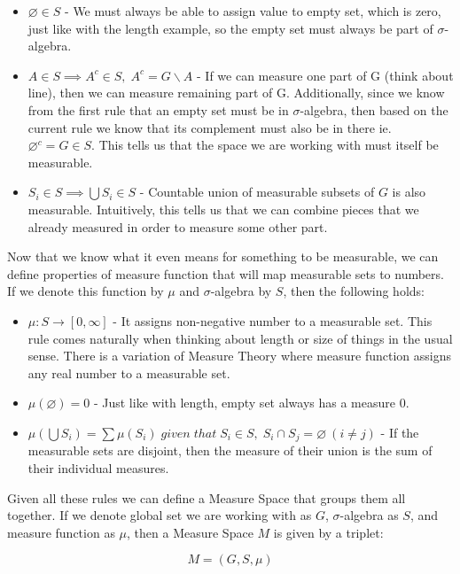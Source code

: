 \documentclass{article}
\begin{document}
\begin{itemize}
    \item $\varnothing \in S$ - We must always be able to assign value to empty set, which is zero, just like with the length example, so the empty set must always be part of $\sigma$-algebra.
    \item $A \in S \implies A^c \in S,\;A^c = G \backslash A$ - If we can measure one part of G (think about line), then we can measure remaining part of G. Additionally, since we know from the first rule that an empty set must be in $\sigma$-algebra, then based on the current rule we know that its complement must also be in there ie. $\varnothing^c = G \in S$. This tells us that the space we are working with must itself be measurable.
    \item $S_i \in S \implies \bigcup S_i \in S$ - Countable union of measurable subsets of $G$ is also measurable. Intuitively, this tells us that we can combine pieces that we already measured in order to measure some other part.
\end{itemize}

Now that we know what it even means for something to be measurable, we can define properties of measure function that will map measurable sets to numbers. If we denote this function by $\mu$ and $\sigma$-algebra by $S$, then the following holds:

\begin{itemize}
    \item $\mu: S \rightarrow [0, \infty]$ - It assigns non-negative number to a measurable set. This rule comes naturally when thinking about length or size of things in the usual sense. There is a variation of Measure Theory where measure function assigns any real number to a measurable set.
    \item $\mu(\varnothing) = 0$ - Just like with length, empty set always has a measure 0.
    \item $\mu(\bigcup S_i) = \sum\mu(S_i)\;given\;that\; S_i \in S,\;S_i \cap S_j = \varnothing\:(i \neq j)$ - If the measurable sets are disjoint, then the measure of their union is the sum of their individual measures.
\end{itemize}

Given all these rules we can define a Measure Space that groups them all together. If we denote global set we are working with as $G$, $\sigma$-algebra as $S$, and measure function as $\mu$, then a Measure Space $M$ is given by a triplet:

\[ M=(G,S,\mu)\]
\end{document}
